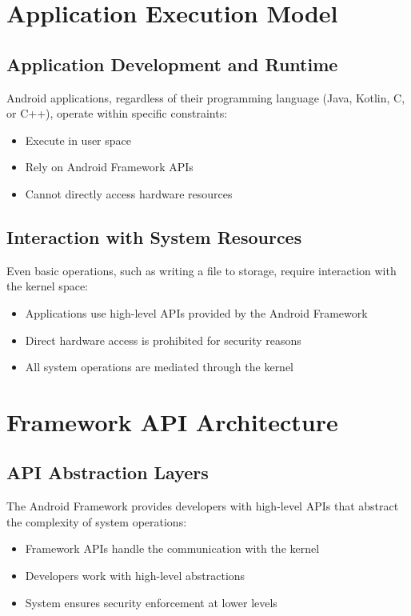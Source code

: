 \documentclass{article}
\begin{document}
\section{Application Execution Model}
\subsection{Application Development and Runtime}
Android applications, regardless of their programming language (Java, Kotlin, C, or C++), operate within specific constraints:
\begin{itemize}
    \item Execute in user space
    \item Rely on Android Framework APIs
    \item Cannot directly access hardware resources
\end{itemize}

\subsection{Interaction with System Resources}
Even basic operations, such as writing a file to storage, require interaction with the kernel space:
\begin{itemize}
    \item Applications use high-level APIs provided by the Android Framework
    \item Direct hardware access is prohibited for security reasons
    \item All system operations are mediated through the kernel
\end{itemize}

\section{Framework API Architecture}
\subsection{API Abstraction Layers}
The Android Framework provides developers with high-level APIs that abstract the complexity of system operations:
\begin{itemize}
    \item Framework APIs handle the communication with the kernel
    \item Developers work with high-level abstractions
    \item System ensures security enforcement at lower levels
\end{itemize}
\end{document}

